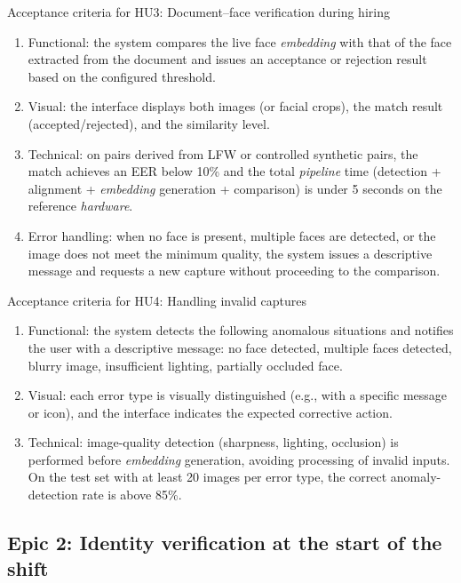 \documentclass[
  11pt, %
]{charter}
\begin{document}
Acceptance criteria for HU3: Document--face verification during hiring
\begin{enumerate}
  \item Functional: the system compares the live face \textit{embedding} with that of the face extracted from the document and issues an acceptance or rejection result based on the configured threshold.
  \item Visual: the interface displays both images (or facial crops), the match result (accepted/rejected), and the similarity level.
  \item Technical: on pairs derived from LFW or controlled synthetic pairs, the match achieves an EER below 10\% and the total \textit{pipeline} time (detection + alignment + \textit{embedding} generation + comparison) is under 5 seconds on the reference \textit{hardware}.
  \item Error handling: when no face is present, multiple faces are detected, or the image does not meet the minimum quality, the system issues a descriptive message and requests a new capture without proceeding to the comparison.
\end{enumerate}

Acceptance criteria for HU4: Handling invalid captures
\begin{enumerate}
  \item Functional: the system detects the following anomalous situations and notifies the user with a descriptive message: no face detected, multiple faces detected, blurry image, insufficient lighting, partially occluded face.
  \item Visual: each error type is visually distinguished (e.g., with a specific message or icon), and the interface indicates the expected corrective action.
  \item Technical: image-quality detection (sharpness, lighting, occlusion) is performed before \textit{embedding} generation, avoiding processing of invalid inputs. On the test set with at least 20 images per error type, the correct anomaly-detection rate is above 85\%.
\end{enumerate}

\subsection{Epic 2: Identity verification at the start of the shift}
\end{document}
